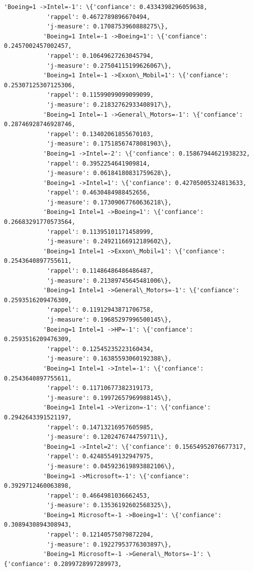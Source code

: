 \documentclass[11pt]{article}
\begin{document}
\begin{Verbatim}[commandchars=\\\{\}]
           'Boeing=1 ->Intel=-1': \{'confiance': 0.4334398296059638,
            'rappel': 0.4672789896670494,
            'j-measure': 0.1708753960888275\},
           'Boeing=1 Intel=-1 ->Boeing=1': \{'confiance': 0.2457002457002457,
            'rappel': 0.10649627263045794,
            'j-measure': 0.27504115199626067\},
           'Boeing=1 Intel=-1 ->Exxon\_Mobil=1': \{'confiance': 0.25307125307125306,
            'rappel': 0.11599099099099099,
            'j-measure': 0.21832762933408917\},
           'Boeing=1 Intel=-1 ->General\_Motors=-1': \{'confiance': 0.28746928746928746,
            'rappel': 0.13402061855670103,
            'j-measure': 0.17518567478081903\},
           'Boeing=1 ->Intel=-2': \{'confiance': 0.15867944621938232,
            'rappel': 0.3952254641909814,
            'j-measure': 0.06184180831759628\},
           'Boeing=1 ->Intel=1': \{'confiance': 0.42705005324813633,
            'rappel': 0.4630484988452656,
            'j-measure': 0.17309067760636218\},
           'Boeing=1 Intel=1 ->Boeing=1': \{'confiance': 0.26683291770573564,
            'rappel': 0.11395101171458999,
            'j-measure': 0.24921166912189602\},
           'Boeing=1 Intel=1 ->Exxon\_Mobil=1': \{'confiance': 0.2543640897755611,
            'rappel': 0.11486486486486487,
            'j-measure': 0.21389745645481006\},
           'Boeing=1 Intel=1 ->General\_Motors=-1': \{'confiance': 0.2593516209476309,
            'rappel': 0.11912943871706758,
            'j-measure': 0.19685297996500145\},
           'Boeing=1 Intel=1 ->HP=-1': \{'confiance': 0.2593516209476309,
            'rappel': 0.12545235223160434,
            'j-measure': 0.16385593060192388\},
           'Boeing=1 Intel=1 ->Intel=-1': \{'confiance': 0.2543640897755611,
            'rappel': 0.11710677382319173,
            'j-measure': 0.19972657969988145\},
           'Boeing=1 Intel=1 ->Verizon=-1': \{'confiance': 0.2942643391521197,
            'rappel': 0.14713216957605985,
            'j-measure': 0.1202476744759711\},
           'Boeing=1 ->Intel=2': \{'confiance': 0.15654952076677317,
            'rappel': 0.42485549132947975,
            'j-measure': 0.045923619893882106\},
           'Boeing=1 ->Microsoft=-1': \{'confiance': 0.3929712460063898,
            'rappel': 0.4664981036662453,
            'j-measure': 0.13536192602568325\},
           'Boeing=1 Microsoft=-1 ->Boeing=1': \{'confiance': 0.3089430894308943,
            'rappel': 0.12140575079872204,
            'j-measure': 0.19227953776303897\},
           'Boeing=1 Microsoft=-1 ->General\_Motors=-1': \{'confiance': 0.2899728997289973,

\end{Verbatim}
\end{document}
